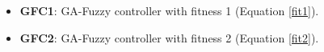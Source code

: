 \documentclass[conference]{IEEEtran}
\begin{document}
%	
\begin{itemize}
	\item \textbf{GFC1}: GA-Fuzzy controller with fitness 1 (Equation \ref{fit1}).
	\item \textbf{GFC2}: GA-Fuzzy controller with fitness 2 (Equation \ref{fit2}).
\end{itemize}
%
\end{document}

